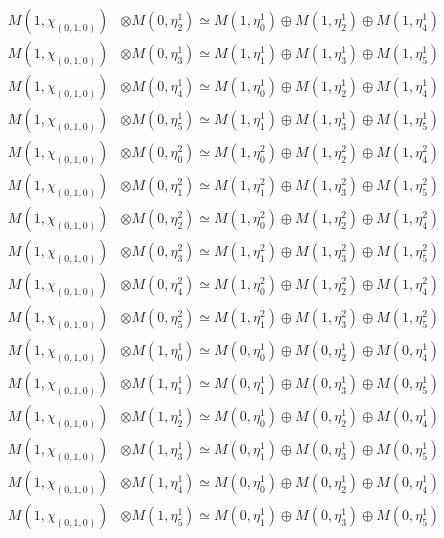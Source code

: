 \begin{align*}
M(1,\chi_{(0,1,0)}) &\otimes M(0,\eta^{1}_{2}) \simeq M(1,\eta^{1}_{0}) \oplus M(1,\eta^{1}_{2}) \oplus M(1,\eta^{1}_{4}) \\
M(1,\chi_{(0,1,0)}) &\otimes M(0,\eta^{1}_{3}) \simeq M(1,\eta^{1}_{1}) \oplus M(1,\eta^{1}_{3}) \oplus M(1,\eta^{1}_{5}) \\
M(1,\chi_{(0,1,0)}) &\otimes M(0,\eta^{1}_{4}) \simeq M(1,\eta^{1}_{0}) \oplus M(1,\eta^{1}_{2}) \oplus M(1,\eta^{1}_{4}) \\
M(1,\chi_{(0,1,0)}) &\otimes M(0,\eta^{1}_{5}) \simeq M(1,\eta^{1}_{1}) \oplus M(1,\eta^{1}_{3}) \oplus M(1,\eta^{1}_{5}) \\
M(1,\chi_{(0,1,0)}) &\otimes M(0,\eta^{2}_{0}) \simeq M(1,\eta^{2}_{0}) \oplus M(1,\eta^{2}_{2}) \oplus M(1,\eta^{2}_{4}) \\
M(1,\chi_{(0,1,0)}) &\otimes M(0,\eta^{2}_{1}) \simeq M(1,\eta^{2}_{1}) \oplus M(1,\eta^{2}_{3}) \oplus M(1,\eta^{2}_{5}) \\
M(1,\chi_{(0,1,0)}) &\otimes M(0,\eta^{2}_{2}) \simeq M(1,\eta^{2}_{0}) \oplus M(1,\eta^{2}_{2}) \oplus M(1,\eta^{2}_{4}) \\
M(1,\chi_{(0,1,0)}) &\otimes M(0,\eta^{2}_{3}) \simeq M(1,\eta^{2}_{1}) \oplus M(1,\eta^{2}_{3}) \oplus M(1,\eta^{2}_{5}) \\
M(1,\chi_{(0,1,0)}) &\otimes M(0,\eta^{2}_{4}) \simeq M(1,\eta^{2}_{0}) \oplus M(1,\eta^{2}_{2}) \oplus M(1,\eta^{2}_{4}) \\
M(1,\chi_{(0,1,0)}) &\otimes M(0,\eta^{2}_{5}) \simeq M(1,\eta^{2}_{1}) \oplus M(1,\eta^{2}_{3}) \oplus M(1,\eta^{2}_{5}) \\
M(1,\chi_{(0,1,0)}) &\otimes M(1,\eta^{1}_{0}) \simeq M(0,\eta^{1}_{0}) \oplus M(0,\eta^{1}_{2}) \oplus M(0,\eta^{1}_{4}) \\
M(1,\chi_{(0,1,0)}) &\otimes M(1,\eta^{1}_{1}) \simeq M(0,\eta^{1}_{1}) \oplus M(0,\eta^{1}_{3}) \oplus M(0,\eta^{1}_{5}) \\
M(1,\chi_{(0,1,0)}) &\otimes M(1,\eta^{1}_{2}) \simeq M(0,\eta^{1}_{0}) \oplus M(0,\eta^{1}_{2}) \oplus M(0,\eta^{1}_{4}) \\
M(1,\chi_{(0,1,0)}) &\otimes M(1,\eta^{1}_{3}) \simeq M(0,\eta^{1}_{1}) \oplus M(0,\eta^{1}_{3}) \oplus M(0,\eta^{1}_{5}) \\
M(1,\chi_{(0,1,0)}) &\otimes M(1,\eta^{1}_{4}) \simeq M(0,\eta^{1}_{0}) \oplus M(0,\eta^{1}_{2}) \oplus M(0,\eta^{1}_{4}) \\
M(1,\chi_{(0,1,0)}) &\otimes M(1,\eta^{1}_{5}) \simeq M(0,\eta^{1}_{1}) \oplus M(0,\eta^{1}_{3}) \oplus M(0,\eta^{1}_{5}) \\
\end{align*}

